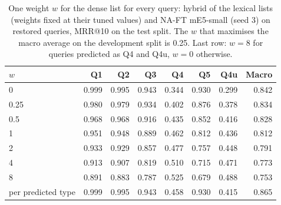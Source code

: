 \begin{table}[t]
\centering
\caption{One weight $w$ for the dense list for every query: hybrid of the lexical lists (weights fixed at their tuned
values) and NA-FT mE5-small (seed 3) on restored queries, MRR@10 on the test split. The $w$ that maximises the macro average on the
development split is 0.25. Last row: $w=8$ for queries predicted
as Q4 and Q4u, $w=0$ otherwise.}
\label{tab:dense_weight}
\small
\setlength{\tabcolsep}{4.5pt}
\begin{tabular}{@{}l rrrrrr r@{}}
\toprule
$w$ & Q1 & Q2 & Q3 & Q4 & Q5 & Q4u & Macro \\
\midrule
0 & 0.999 & 0.995 & 0.943 & 0.344 & 0.930 & 0.299 & 0.842 \\
0.25 & 0.980 & 0.979 & 0.934 & 0.402 & 0.876 & 0.378 & 0.834 \\
0.5 & 0.968 & 0.968 & 0.916 & 0.435 & 0.852 & 0.416 & 0.828 \\
1 & 0.951 & 0.948 & 0.889 & 0.462 & 0.812 & 0.436 & 0.812 \\
2 & 0.933 & 0.929 & 0.857 & 0.477 & 0.757 & 0.448 & 0.791 \\
4 & 0.913 & 0.907 & 0.819 & 0.510 & 0.715 & 0.471 & 0.773 \\
8 & 0.891 & 0.883 & 0.787 & 0.525 & 0.679 & 0.488 & 0.753 \\
\midrule
per predicted type & 0.999 & 0.995 & 0.943 & 0.458 & 0.930 & 0.415 & 0.865 \\
\bottomrule
\end{tabular}
\end{table}

